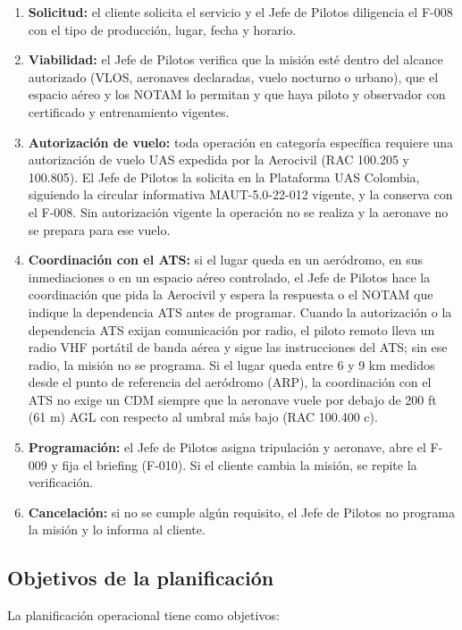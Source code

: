 \begin{enumerate}
\item \textbf{Solicitud:} el cliente solicita el servicio y el Jefe de Pilotos diligencia el F-008 con el tipo de producción, lugar, fecha y horario.
\item \textbf{Viabilidad:} el Jefe de Pilotos verifica que la misión esté dentro del alcance autorizado (VLOS, aeronaves declaradas, vuelo nocturno o urbano), que el espacio aéreo y los NOTAM lo permitan y que haya piloto y observador con certificado y entrenamiento vigentes.
\item \textbf{Autorización de vuelo:} toda operación en categoría específica requiere una autorización de vuelo UAS expedida por la Aerocivil (RAC 100.205 y 100.805). El Jefe de Pilotos la solicita en la Plataforma UAS Colombia, siguiendo la circular informativa MAUT-5.0-22-012 vigente, y la conserva con el F-008. Sin autorización vigente la operación no se realiza y la aeronave no se prepara para ese vuelo.
\item \textbf{Coordinación con el ATS:} si el lugar queda en un aeródromo, en sus inmediaciones o en un espacio aéreo controlado, el Jefe de Pilotos hace la coordinación que pida la Aerocivil y espera la respuesta o el NOTAM que indique la dependencia ATS antes de programar. Cuando la autorización o la dependencia ATS exijan comunicación por radio, el piloto remoto lleva un radio VHF portátil de banda aérea y sigue las instrucciones del ATS; sin ese radio, la misión no se programa. Si el lugar queda entre 6 y 9 km medidos desde el punto de referencia del aeródromo (ARP), la coordinación con el ATS no exige un CDM siempre que la aeronave vuele por debajo de 200 ft (61 m) AGL con respecto al umbral más bajo (RAC 100.400 c).
\item \textbf{Programación:} el Jefe de Pilotos asigna tripulación y aeronave, abre el F-009 y fija el briefing (F-010). Si el cliente cambia la misión, se repite la verificación.
\item \textbf{Cancelación:} si no se cumple algún requisito, el Jefe de Pilotos no programa la misión y lo informa al cliente.
\end{enumerate}

\subsection{Objetivos de la planificación}

La planificación operacional tiene como objetivos:

